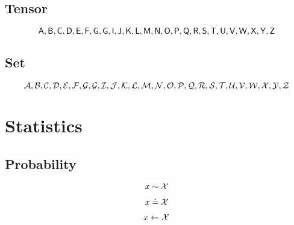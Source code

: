 \documentclass[a4paper,11pt]{article}
\begin{document}

\subsection{Tensor}
\label{sub:tensor}

\begin{equation*}
\mathsf{A}, \mathsf{B}, \mathsf{C}, \mathsf{D}, \mathsf{E}, \mathsf{F}, \mathsf{G}, \mathsf{G}, \mathsf{I}, \mathsf{J}, \mathsf{K}, \mathsf{L}, \mathsf{M}, \mathsf{N}, \mathsf{O}, \mathsf{P}, \mathsf{Q}, \mathsf{R}, \mathsf{S}, \mathsf{T}, \mathsf{U}, \mathsf{V}, \mathsf{W}, \mathsf{X}, \mathsf{Y}, \mathsf{Z}
\end{equation*}

\subsection{Set}
\label{sub:set}

\begin{equation*}
\mathcal{A}, \mathcal{B}, \mathcal{C}, \mathcal{D}, \mathcal{E}, \mathcal{F}, \mathcal{G}, \mathcal{G}, \mathcal{I}, \mathcal{J}, \mathcal{K}, \mathcal{L}, \mathcal{M}, \mathcal{N}, \mathcal{O}, \mathcal{P}, \mathcal{Q}, \mathcal{R}, \mathcal{S}, \mathcal{T}, \mathcal{U}, \mathcal{V}, \mathcal{W}, \mathcal{X}, \mathcal{Y}, \mathcal{Z}
\end{equation*}

\section{Statistics}
\label{sec:statistics}

\subsection{Probability} %
\label{sub:probability}

\begin{equation}
	x\sim \mathcal{X}
\end{equation}

\begin{equation}
	x\doteq \mathcal{X}
\end{equation}

\begin{equation}
	x\leftarrow \mathcal{X}
\end{equation}
\end{document}
